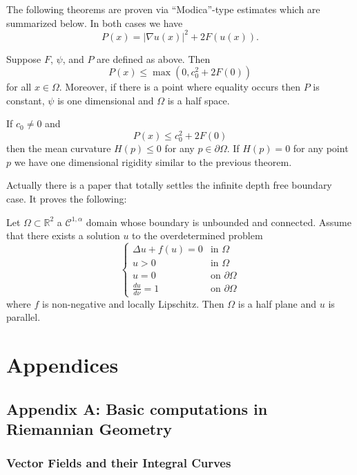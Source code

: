 The following theorems are proven via ``Modica''-type estimates which are summarized below. In both cases we have 
\[P(x) = |\nabla u(x)|^2 + 2F(u(x)).\]

\begin{theorem}
    Suppose $F$, $\psi$, and $P$ are defined as above. Then
    \[P(x) \leq \max(0, c_0^2 + 2F(0))\]
    for all $x \in \Omega$. Moreover, if there is a point where equality occurs then $P$ is constant, $\psi$ is one dimensional and $\Omega$ is a half space.
\end{theorem}

\begin{theorem}
    If $c_0 \neq 0$ and 
    \[P(x) \leq c_0^2 + 2F(0)\]
    then the mean curvature $H(p) \leq 0$ for any $p \in \partial \Omega$. If $H(p) = 0$ for any point $p$ we have one dimensional rigidity similar to the previous theorem.
\end{theorem}

Actually there is a paper \cite{RRS17} that totally settles the infinite depth free boundary case. It proves the following:
\begin{theorem}
    Let $\Omega \subset \mathbb{R}^2$ a $\mathcal{C}^{1,\alpha}$ domain whose boundary is unbounded and connected. Assume that there exists a solution $u$ to the overdetermined problem
    \[\begin{cases}
        \Delta u + f(u) = 0 & \text{in $\Omega$} \\
        u > 0 & \text{in $\Omega$} \\
        u = 0 & \text{on $\partial \Omega$} \\
        \frac{du}{d\nu} = 1 & \text{on $\partial \Omega$}
    \end{cases}\]
    where $f$ is non-negative and locally Lipschitz. Then $\Omega$ is a half plane and $u$ is parallel.
    
\end{theorem}



\chapter{Appendices}
\section{Appendix A: Basic computations in Riemannian Geometry}

\subsection{Vector Fields and their Integral Curves}

